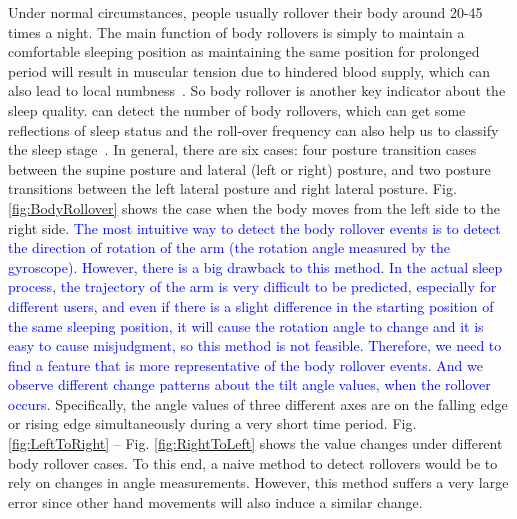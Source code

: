 Under normal circumstances, people usually rollover their body around 20-45 times a night. The main function of body rollovers is simply to maintain a comfortable sleeping position as maintaining the same position for prolonged period will result in muscular tension due to hindered blood supply, which can also lead to local numbness~\cite{rollover2014}. So body rollover is another key indicator about the sleep quality. {\systemname} can detect the number of body rollovers, which can get some reflections of sleep status and the roll-over frequency can also help us to classify the sleep stage~\cite{rollover2007}. In general, there are six cases: four posture transition cases between the supine posture and lateral (left or right) posture, and two posture transitions between the left lateral posture and right lateral posture. Fig. \ref{fig:BodyRollover} shows the case when the body moves from the left side to the right side. \textcolor{blue}{The most intuitive way to detect the body rollover events is to detect the direction of rotation of the arm (the rotation angle measured by the gyroscope). However, there is a big drawback to this method. In the actual sleep process, the trajectory of the arm is very difficult to be predicted, especially for different users, and even if there is a slight difference in the starting position of the same sleeping position, it will cause the rotation angle to change and it is easy to cause misjudgment, so this method is not feasible. Therefore, we need to find a feature that is more representative of the body rollover events. And  we observe different change patterns about the tilt angle values, when the rollover occurs.} Specifically, the angle values of three different axes are on the falling edge or rising edge simultaneously during a very short time period. Fig. \ref{fig:LeftToRight} -- Fig. \ref{fig:RightToLeft} shows the value changes under different body rollover cases. To this end, a naive method to detect rollovers would be to rely on changes in angle measurements. However, this method suffers a very large error since other hand movements will also induce a similar change.


